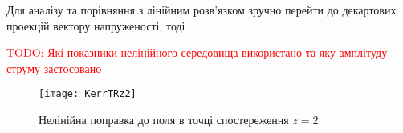 Для аналізу та порівняння з лінійним розв'язком зручно перейти до 
декартових проекцій вектору напруженості, тоді

%
%


\textcolor{red} {TODO: Які показники нелінійного середовища використано та яку амплітуду струму застосовано}

\begin{figure}[htbp] \begin{center}
\texttt{[image: KerrTRz2]}
\caption{Нелінійна поправка до поля в точці спостереження $ z = 2 $.} 
\label{fig:KerrTRz2}
\end{center} \end{figure}

